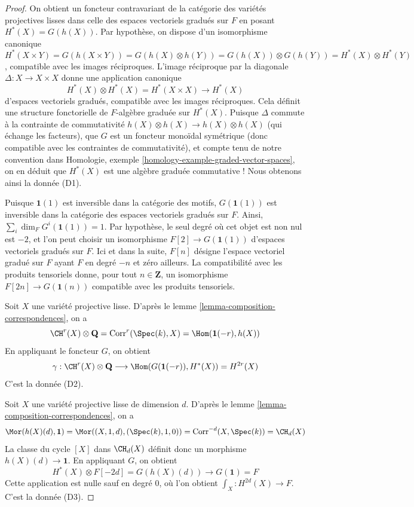 \begin{proof}
On obtient un foncteur contravariant de la catégorie des variétés
projectives lisses dans celle des espaces vectoriels gradués sur $F$
en posant $H^*(X) = G(h(X))$. Par hypothèse, on dispose d'un isomorphisme
canonique
$$
H^*(X \times Y) = G(h(X \times Y)) = G(h(X) \otimes h(Y)) =
G(h(X)) \otimes G(h(Y)) = H^*(X) \otimes H^*(Y)
$$,
compatible avec les images réciproques. L'image réciproque par la diagonale
$\Delta : X \to X \times X$ donne une application canonique
$$
H^*(X) \otimes H^*(X) = H^*(X \times X) \to H^*(X)
$$
d'espaces vectoriels gradués, compatible avec les images réciproques.
Cela définit une structure fonctorielle de $F$-algèbre graduée sur
$H^*(X)$. Puisque $\Delta$ commute à la contrainte de commutativité
$h(X) \otimes h(X) \to h(X) \otimes h(X)$ (qui échange les facteurs),
que $G$ est un foncteur monoïdal symétrique (donc compatible avec
les contraintes de commutativité), et compte tenu de notre convention dans
Homologie, exemple \ref{homology-example-graded-vector-spaces},
on en déduit que $H^*(X)$ est une algèbre graduée
commutative ! Nous obtenons ainsi la donnée (D1).

\medskip\noindent
Puisque $\mathbf{1}(1)$ est inversible dans la catégorie des motifs,
$G(\mathbf{1}(1))$ est inversible dans la catégorie des
espaces vectoriels gradués sur $F$. Ainsi, $\sum_i \dim_F G^i(\mathbf{1}(1)) = 1$.
Par hypothèse, le seul degré où cet objet est non nul est $-2$, et l'on peut
choisir un isomorphisme $F[2] \to G(\mathbf{1}(1))$ d'espaces vectoriels gradués sur $F$.
Ici et dans la suite, $F[n]$ désigne l'espace vectoriel gradué sur $F$ ayant
$F$ en degré $-n$ et zéro ailleurs. La compatibilité avec
les produits tensoriels donne, pour tout $n \in \mathbf{Z}$, un isomorphisme
$F[2n] \to G(\mathbf{1}(n))$ compatible avec les produits tensoriels.

\medskip\noindent
Soit $X$ une variété projective lisse. D'après
le lemme \ref{lemma-composition-correspondences}, on a
$$
\CH^r(X) \otimes \mathbf{Q} = \text{Corr}^r(\Spec(k), X) =
\Hom(\mathbf{1}(-r), h(X))
$$
En appliquant le foncteur $G$, on obtient
$$
\gamma :
\CH^r(X) \otimes \mathbf{Q} \longrightarrow
\Hom(G(\mathbf{1}(-r)), H^*(X)) = H^{2r}(X)
$$
C'est la donnée (D2).

\medskip\noindent
Soit $X$ une variété projective lisse de dimension $d$. D'après
le lemme \ref{lemma-composition-correspondences}, on a
$$
\Mor(h(X)(d), \mathbf{1}) = \Mor((X, 1, d), (\Spec(k), 1, 0)) =
\text{Corr}^{-d}(X, \Spec(k)) = \CH_d(X)
$$
La classe du cycle $[X]$ dans $\CH_d(X)$ définit donc un morphisme
$h(X)(d) \to \mathbf{1}$. En appliquant $G$, on obtient
$$
H^*(X) \otimes F[-2d] = G(h(X)(d)) \longrightarrow G(\mathbf{1}) = F
$$
Cette application est nulle sauf en degré $0$, où l'on obtient
$\int_X : H^{2d}(X) \to F$. C'est la donnée (D3).


\end{proof}
